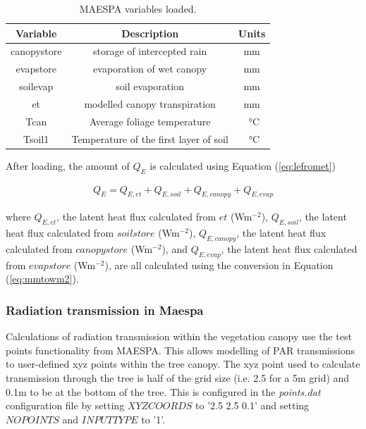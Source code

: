 \documentclass[preprint,12pt,authoryear]{elsarticle}
\begin{document}
\begin{center}
\begin{table}[!htbp]
\caption{MAESPA variables loaded.\label{tab:maevariables}} 
  \begin{tabular}{  | c | c | c | } 
	\hline  \textbf{Variable} & \textbf{Description} & \textbf{Units} \\ \hline
	canopystore & storage of intercepted rain & mm   \\ \hline
	evapstore & evaporation of wet canopy & mm   \\ \hline
	soilevap & soil evaporation & mm   \\ \hline
	et & modelled canopy transpiration & mm   \\ \hline
	Tcan & Average foliage temperature & \SI{}{\degreeCelsius}  \\ \hline
	Tsoil1 & Temperature of the first layer of soil & \SI{}{\degreeCelsius}  \\ \hline

  \end{tabular} 
\end{table}
\end{center}  

After loading, the amount of $Q_{E}$ is calculated using Equation (\ref{eq:lefromet})

\begin{equation}\label{eq:lefromet} 
\begin{aligned}
Q_{E} = Q_{E,et} + Q_{E,soil} + Q_{E,canopy} + Q_{E,evap} 
\end{aligned}
\end{equation}

where $Q_{E,et}$, the latent heat flux calculated from $et$ (Wm$^{-2}$), $Q_{E,soil}$, the latent heat flux calculated from $soilstore$ (Wm$^{-2}$), $Q_{E,canopy}$, the latent heat flux calculated from $canopystore$ (Wm$^{-2}$), and $Q_{E,evap}$, the latent heat flux calculated from $evapstore$ (Wm$^{-2}$),  are all calculated using the conversion in Equation (\ref{eq:mmtowm2}).


\subsubsection{Radiation transmission in Maespa}\label{sec:pointsdatfile}
Calculations of radiation transmission within the vegetation canopy use the test points functionality from MAESPA. This allows modelling of PAR transmissions to user-defined xyz points within the tree canopy. The xyz point used to calculate transmission through the tree is half of the grid size (i.e. 2.5 for a 5m grid) and 0.1m to be at the bottom of the tree. This is configured in the \textit{points.dat} configuration file by setting $XYZ COORDS$ to '2.5 2.5 0.1' and setting $NOPOINTS$ and $INPUTTYPE$ to '1'.
\end{document}
